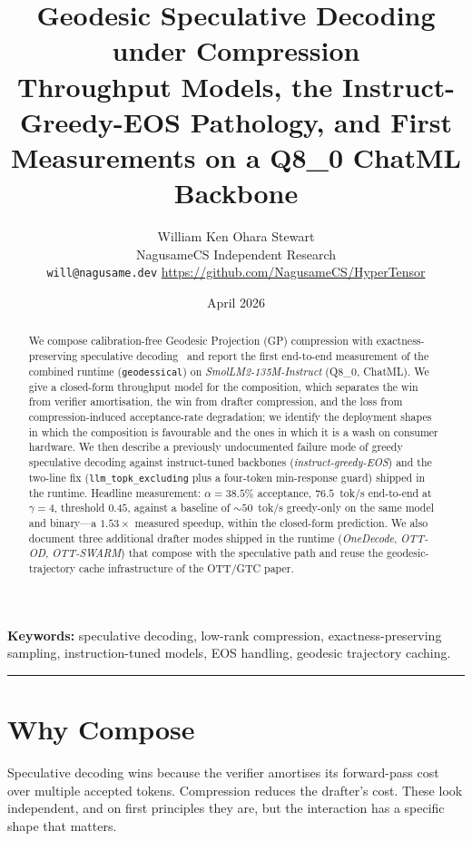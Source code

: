 \documentclass[11pt]{article}
\title{\textbf{Geodesic Speculative Decoding under Compression}\\[0.4em]
\large Throughput Models, the Instruct-Greedy-EOS Pathology, and First Measurements
on a Q8\_0 ChatML Backbone}
\author{William Ken Ohara Stewart\\
\small NagusameCS Independent Research\\
\small \texttt{will@nagusame.dev} \quad \url{https://github.com/NagusameCS/HyperTensor}}
\date{April 2026}
\begin{document}
\maketitle
\hypertensorbanner

\begin{abstract}
\noindent
We compose calibration-free Geodesic Projection (GP) compression with
exactness-preserving speculative decoding~\cite{leviathan2023speculative,
chen2023speculative} and report the first end-to-end measurement of the
combined runtime (\texttt{geodessical}) on
\textit{SmolLM2-135M-Instruct} (Q8\_0, ChatML).  We give a closed-form
throughput model for the composition, which separates the win from
verifier amortisation, the win from drafter compression, and the loss
from compression-induced acceptance-rate degradation; we identify the
deployment shapes in which the composition is favourable and the ones
in which it is a wash on consumer hardware.  We then describe a previously
undocumented failure mode of greedy speculative decoding against
instruct-tuned backbones (\emph{instruct-greedy-EOS}) and the
two-line fix (\texttt{llm\_topk\_excluding} plus a four-token min-response
guard) shipped in the runtime.  Headline measurement: $\alpha{=}38.5\%$
acceptance, $76.5$~tok/s end-to-end at $\gamma{=}4$,
threshold $0.45$, against a baseline of $\sim 50$~tok/s greedy-only on the
same model and binary---a $1.53\times$ measured speedup, within the
closed-form prediction.  We also document three additional drafter modes
shipped in the runtime (\emph{OneDecode}, \emph{OTT-OD}, \emph{OTT-SWARM})
that compose with the speculative path and reuse the geodesic-trajectory
cache infrastructure of the OTT/GTC paper.
\end{abstract}

\noindent\textbf{Keywords:} speculative decoding, low-rank compression,
exactness-preserving sampling, instruction-tuned models, EOS handling,
geodesic trajectory caching.

\tableofcontents
\bigskip\hrule\bigskip

\section{Why Compose}
\label{sec:why}
Speculative decoding wins because the verifier amortises its forward-pass
cost over multiple accepted tokens.  Compression reduces the drafter's
cost.  These look independent, and on first principles they are, but the
interaction has a specific shape that matters.
\end{document}
